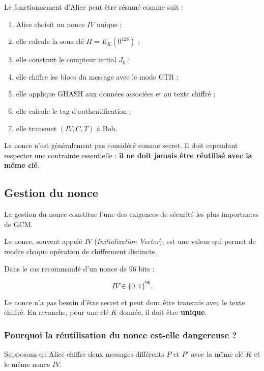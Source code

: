 \documentclass[12pt,a4paper]{article}
\begin{document}
Le fonctionnement d'Alice peut être résumé comme suit :

\begin{enumerate}
    \item Alice choisit un nonce $IV$ unique ;
    \item elle calcule la sous-clé
    $H=E_K(0^{128})$ ;
    \item elle construit le compteur initial $J_0$ ;
    \item elle chiffre les blocs du message avec le mode CTR ;
    \item elle applique GHASH aux données associées et au texte chiffré ;
    \item elle calcule le tag d'authentification ;
    \item elle transmet $(IV,C,T)$ à Bob.
\end{enumerate}

Le nonce n'est généralement pas considéré comme secret. Il doit
cependant respecter une contrainte essentielle : \textbf{il ne doit
jamais être réutilisé avec la même clé}.

\subsection{Gestion du nonce}
\label{subsec:gcm_nonce}

La gestion du nonce constitue l'une des exigences de sécurité les
plus importantes de GCM.

Le nonce, souvent appelé $IV$ (\textit{Initialization Vector}), est
une valeur qui permet de rendre chaque opération de chiffrement
distincte.

Dans le cas recommandé d'un nonce de $96$ bits :

\begin{equation}
IV \in \{0,1\}^{96}.
\end{equation}

Le nonce n'a pas besoin d'être secret et peut donc être transmis avec
le texte chiffré. En revanche, pour une clé $K$ donnée, il doit être
\textbf{unique}.

\subsubsection{Pourquoi la réutilisation du nonce est-elle dangereuse ?}

Supposons qu'Alice chiffre deux messages différents $P$ et $P'$ avec
la même clé $K$ et le même nonce $IV$.
\end{document}
